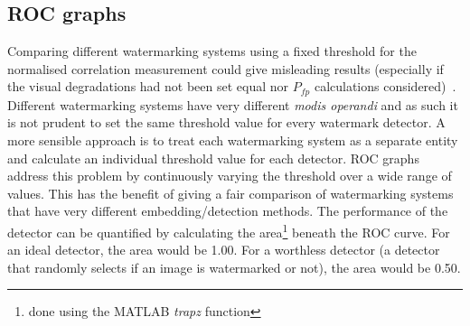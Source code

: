 \documentclass[10pt,twocolumn]{article}
\begin{document}
\subsection{ROC graphs}
Comparing different watermarking systems using a fixed threshold for the normalised correlation
measurement 
could give misleading results
(especially if the visual degradations had not been set equal nor $P_{\mathit fp}$ calculations considered)~\cite{ECCb4:book}.
Different watermarking systems have very different \emph{modis operandi} and as such it is not prudent 
to set the same threshold value for every watermark detector. A more sensible approach is to 
treat each watermarking system as a separate entity and calculate an individual threshold value
for each detector. 
ROC graphs~\cite{rocErk98} 
address this problem by continuously varying the threshold over 
a wide range of values. This has the benefit of giving a fair comparison of
watermarking systems that have very different embedding/detection methods.
The performance of the detector can be quantified by calculating the area\footnote{done using the MATLAB \emph{trapz} function}
beneath the 
ROC curve.
For an ideal detector, the area would be 1.00. For a worthless detector (a detector
that randomly selects if an image is watermarked or not),
the area would be 0.50.
\end{document}
